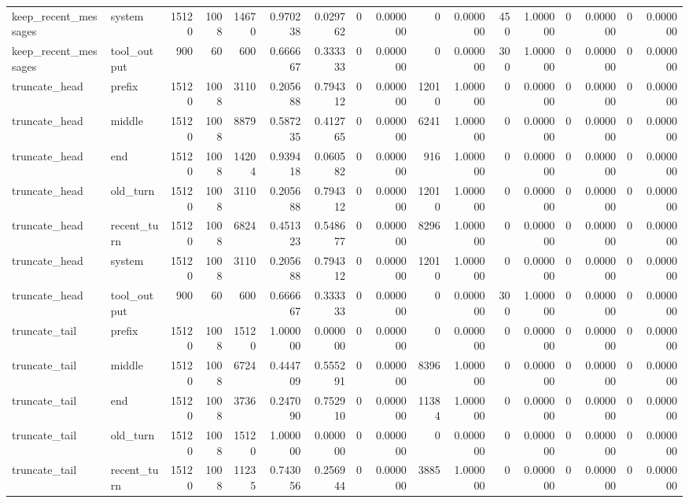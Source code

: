 \begin{tabular}{llrrrrrrrrrrrrrrr}
keep_recent_messages & system & 15120 & 1008 & 14670 & 0.970238 & 0.029762 & 0 & 0.000000 & 0 & 0.000000 & 450 & 1.000000 & 0 & 0.000000 & 0 & 0.000000 \\
keep_recent_messages & tool_output & 900 & 60 & 600 & 0.666667 & 0.333333 & 0 & 0.000000 & 0 & 0.000000 & 300 & 1.000000 & 0 & 0.000000 & 0 & 0.000000 \\
truncate_head & prefix & 15120 & 1008 & 3110 & 0.205688 & 0.794312 & 0 & 0.000000 & 12010 & 1.000000 & 0 & 0.000000 & 0 & 0.000000 & 0 & 0.000000 \\
truncate_head & middle & 15120 & 1008 & 8879 & 0.587235 & 0.412765 & 0 & 0.000000 & 6241 & 1.000000 & 0 & 0.000000 & 0 & 0.000000 & 0 & 0.000000 \\
truncate_head & end & 15120 & 1008 & 14204 & 0.939418 & 0.060582 & 0 & 0.000000 & 916 & 1.000000 & 0 & 0.000000 & 0 & 0.000000 & 0 & 0.000000 \\
truncate_head & old_turn & 15120 & 1008 & 3110 & 0.205688 & 0.794312 & 0 & 0.000000 & 12010 & 1.000000 & 0 & 0.000000 & 0 & 0.000000 & 0 & 0.000000 \\
truncate_head & recent_turn & 15120 & 1008 & 6824 & 0.451323 & 0.548677 & 0 & 0.000000 & 8296 & 1.000000 & 0 & 0.000000 & 0 & 0.000000 & 0 & 0.000000 \\
truncate_head & system & 15120 & 1008 & 3110 & 0.205688 & 0.794312 & 0 & 0.000000 & 12010 & 1.000000 & 0 & 0.000000 & 0 & 0.000000 & 0 & 0.000000 \\
truncate_head & tool_output & 900 & 60 & 600 & 0.666667 & 0.333333 & 0 & 0.000000 & 0 & 0.000000 & 300 & 1.000000 & 0 & 0.000000 & 0 & 0.000000 \\
truncate_tail & prefix & 15120 & 1008 & 15120 & 1.000000 & 0.000000 & 0 & 0.000000 & 0 & 0.000000 & 0 & 0.000000 & 0 & 0.000000 & 0 & 0.000000 \\
truncate_tail & middle & 15120 & 1008 & 6724 & 0.444709 & 0.555291 & 0 & 0.000000 & 8396 & 1.000000 & 0 & 0.000000 & 0 & 0.000000 & 0 & 0.000000 \\
truncate_tail & end & 15120 & 1008 & 3736 & 0.247090 & 0.752910 & 0 & 0.000000 & 11384 & 1.000000 & 0 & 0.000000 & 0 & 0.000000 & 0 & 0.000000 \\
truncate_tail & old_turn & 15120 & 1008 & 15120 & 1.000000 & 0.000000 & 0 & 0.000000 & 0 & 0.000000 & 0 & 0.000000 & 0 & 0.000000 & 0 & 0.000000 \\
truncate_tail & recent_turn & 15120 & 1008 & 11235 & 0.743056 & 0.256944 & 0 & 0.000000 & 3885 & 1.000000 & 0 & 0.000000 & 0 & 0.000000 & 0 & 0.000000 \\

\end{tabular}
